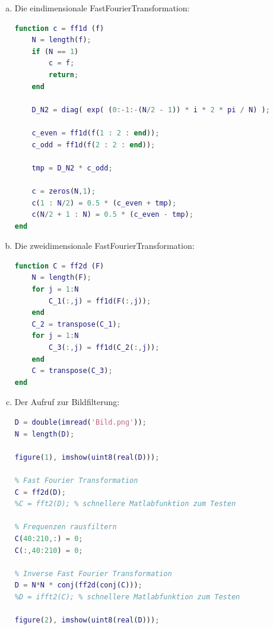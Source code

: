 \documentclass{mywork}
\begin{document}
\begin{aufgabe}
	\begin{enumerate}[a)]
		\item
			Die eindimensionale FastFourierTransformation:
			\begin{lstlisting}[language=matlab]
% Stephan Hilb, 2706616
function c = ff1d (f)
	N = length(f);
	if (N == 1)
		c = f;
		return;
	end

	D_N2 = diag( exp( (0:-1:-(N/2 - 1)) * i * 2 * pi / N) );

	c_even = ff1d(f(1 : 2 : end));
	c_odd = ff1d(f(2 : 2 : end));

	tmp = D_N2 * c_odd;

	c = zeros(N,1);
	c(1 : N/2) = 0.5 * (c_even + tmp);
	c(N/2 + 1 : N) = 0.5 * (c_even - tmp);
end
			\end{lstlisting}
		\item
			Die zweidimensionale FastFourierTransformation:
			\begin{lstlisting}[language=matlab]
% Stephan Hilb, 2706616
function C = ff2d (F)
	N = length(F);
	for j = 1:N
		C_1(:,j) = ff1d(F(:,j));
	end
	C_2 = transpose(C_1);
	for j = 1:N
		C_3(:,j) = ff1d(C_2(:,j));
	end
	C = transpose(C_3);
end
			\end{lstlisting}
		\newpage
		\item
			Der Aufruf zur Bildfilterung:
			\begin{lstlisting}[language=matlab]
% Stephan Hilb, 2706616
D = double(imread('Bild.png'));
N = length(D);

figure(1), imshow(uint8(real(D)));

% Fast Fourier Transformation
C = ff2d(D);
%C = fft2(D); % schnellere Matlabfunktion zum Testen

% Frequenzen rausfiltern
C(40:210,:) = 0;
C(:,40:210) = 0;

% Inverse Fast Fourier Transformation
D = N*N * conj(ff2d(conj(C)));
%D = ifft2(C); % schnellere Matlabfunktion zum Testen

figure(2), imshow(uint8(real(D)));
			\end{lstlisting}


\end{enumerate}
\end{aufgabe}
\end{document}
